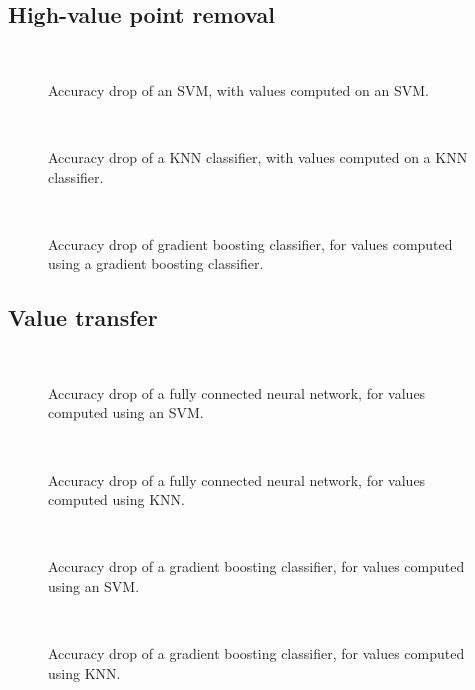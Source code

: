 \documentclass[10pt]{article}
\begin{document}
\subsection{High-value point removal}\label{app:high-value}

\begin{figure}[h]
  \
  \caption{\label{fig:acc-svm-svm}Accuracy drop of an SVM, with values
  computed on an SVM.}
\end{figure}

\begin{figure}[h]
  \
  \caption{\label{fig:acc-knn-knn}Accuracy drop of a KNN classifier, with
  values computed on a KNN classifier.}
\end{figure}

\begin{figure}[h]
  \
  \caption{\label{fig:acc-mlp-mlp}Accuracy drop of gradient boosting
  classifier, for values computed using a gradient boosting classifier.}
\end{figure}

\subsection{Value transfer}\label{app:value-transfer}

\begin{figure}[h]
  \
  \caption{\label{fig:transfer-svm-mlp}Accuracy drop of a fully connected
  neural network, for values computed using an SVM.}
\end{figure}

\begin{figure}[h]
  \
  \caption{\label{fig:transfer-knn-mlp}Accuracy drop of a fully connected
  neural network, for values computed using KNN.}
\end{figure}

\begin{figure}[h]
  \
  \caption{\label{fig:transfer-svm-gb}Accuracy drop of a gradient boosting
  classifier, for values computed using an SVM.}
\end{figure}

\begin{figure}[h]
  \
  \caption{\label{fig:transfer-knn-gb}Accuracy drop of a gradient boosting
  classifier, for values computed using KNN.}
\end{figure}
\end{document}
